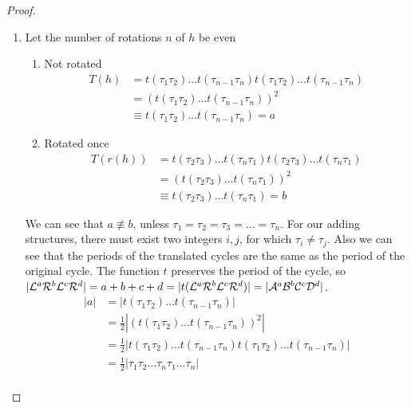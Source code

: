 \begin{proof}
	\begin{enumerate}
		\item Let the number of rotations $n$ of $h$ be even
		      \begin{enumerate}[label=\alph*)]
			      \item Not rotated
			            \begin{align*}
				            T(h) & = t(\tau_1\tau_2) \dots t(\tau_{n-1}\tau_n) t(\tau_1\tau_2) \dots t(\tau_{n-1}\tau_n) \\
				                 & = (t(\tau_1\tau_2) \dots t(\tau_{n-1}\tau_n))^2                                       \\
				                 & \equiv t(\tau_1\tau_2) \dots t(\tau_{n-1}\tau_n) = a
			            \end{align*}
			      \item Rotated once
			            \begin{align*}
				            T(r(h)) & = t(\tau_2\tau_3) \dots t(\tau_{n}\tau_1) t(\tau_2\tau_3) \dots t(\tau_{n}\tau_1) \\
				                    & = (t(\tau_2\tau_3) \dots t(\tau_{n}\tau_1))^2                                     \\
				                    & \equiv t(\tau_2\tau_3) \dots t(\tau_{n}\tau_1) = b
			            \end{align*}
		      \end{enumerate}
		      We can see that $a \nequiv b$, unless $\tau_1 = \tau_2 = \tau_3 = \dots = \tau_n$.
		      For our adding structures, there must exist two integers $i, j$, for which $\tau_i \neq \tau_j$.
		      Also we can see that the periods of the translated cycles are the same as the period of the original cycle.
		      The function $t$ preserves the period of the cycle, so $|\mathcal{L}^a\mathcal{R}^b\mathcal{L}^c\mathcal{R}^d| = a + b + c + d = |t(\mathcal{L}^a\mathcal{R}^b\mathcal{L}^c\mathcal{R}^d)| = |\mathcal{A}^a\mathcal{B}^b\mathcal{C}^c\mathcal{D}^d|$.
		      \begin{align*}
			      |a| & = |t(\tau_1\tau_2) \dots t(\tau_{n-1}\tau_n)|                                                       \\
			          & = \frac{1}{2} |(t(\tau_1\tau_2) \dots t(\tau_{n-1}\tau_n))^2|                                       \\
			          & = \frac{1}{2} |t(\tau_1\tau_2) \dots t(\tau_{n-1}\tau_n) t(\tau_1\tau_2) \dots t(\tau_{n-1}\tau_n)| \\
			          & = \frac{1}{2} |\tau_1\tau_2 \dots \tau_n\tau_1 \dots \tau_n|                                        \\

\end{align*}
\end{enumerate}
\end{proof}
